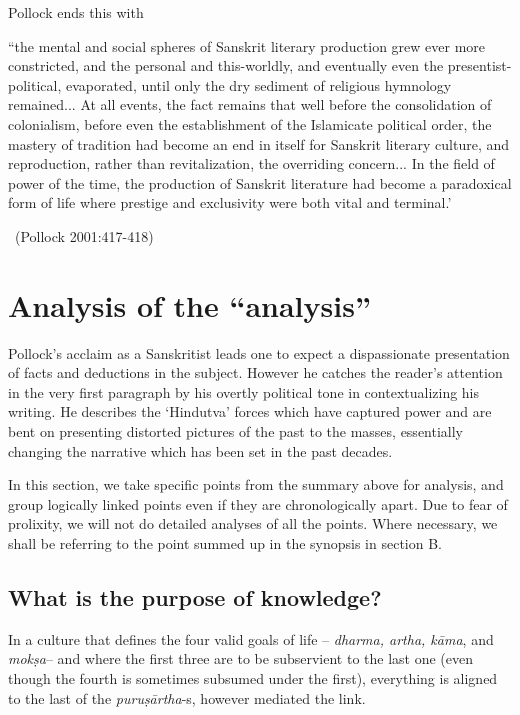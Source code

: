 Pollock ends this with 

\begin{myquote}
\eleven
“the mental and social spheres of Sanskrit literary production grew ever more constricted, and the personal and this-worldly, and eventually even the presentist-political, evaporated, until only the dry sediment of religious hymnology remained... At all events, the fact remains that well before the consolidation of colonialism, before even the establishment of the Islamicate political order, the mastery of tradition had become an end in itself for Sanskrit literary culture, and reproduction, rather than revitalization, the overriding concern... In the field of power of the time, the production of Sanskrit literature had become a paradoxical form of life where prestige and exclusivity were both vital and terminal.’
\vskip -5pt

~\hfill(Pollock 2001:417-418)
\end{myquote}
\vskip -40pt

\section{Analysis of the “analysis”}
\vskip -5pt

Pollock’s acclaim as a Sanskritist leads one to expect a dispassionate presentation of facts and deductions in the subject. However he catches the reader’s attention in the very first paragraph by his overtly political tone in contextualizing his writing. He describes the ‘Hindutva’ forces which have captured power and are bent on presenting distorted pictures of the past to the masses, essentially changing the narrative which has been set in the past decades. 

In this section, we take specific points from the summary above for analysis, and group logically linked points even if they are chronologically apart. Due to fear of prolixity, we will not do detailed analyses of all the points. Where necessary, we shall be referring to the point summed up in the synopsis in section B.
\vskip -40pt

\subsection{What is the purpose of knowledge?}
\vskip -5pt

In a culture that defines the four valid goals of life – {\sl dharma, artha, kāma}, and {\sl mokṣa}– and where the first three are to be subservient to the last one (even though the fourth is sometimes subsumed under the first), everything is aligned to the last of the {\sl puruṣārtha}-s, however mediated the link. 

